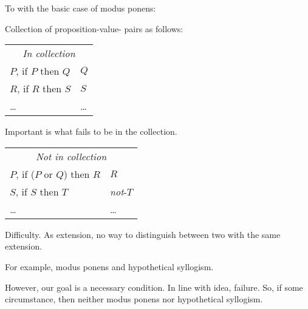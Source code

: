 \begin{note}
  To  with the basic case of modus ponens:

  \begin{illustration}
    Collection of proposition-value-\pool{} pairs as follows:

    \begin{center}
      \begin{tabular}[h]{p{.55\linewidth}|p{.4\linewidth}}
        \multicolumn{2}{c}{\emph{In collection}} \\
        \(P\), if \(P\) then \(Q\) & \(Q\) \\
        \(R\), if \(R\) then \(S\) & \(S\) \\
        \dots & \dots \\
      \end{tabular}
    \end{center}

    Important is what fails to be in the collection.

    \begin{center}
      \begin{tabular}[h]{p{.55\linewidth}|p{.4\linewidth}}
        \multicolumn{2}{c}{\emph{Not in collection}} \\
        \(P\), if (\(P\text{ or }Q\)) then \(R\) & \(R\) \\
        \(S\), if \(S\) then \(T\) & \emph{not}-\(T\) \\
        \dots & \dots \\
      \end{tabular}
    \end{center}
  \end{illustration}
\end{note}

\begin{note}
  Difficulty.
  As extension, no way to distinguish between two  with the same extension.

  For example, modus ponens and hypothetical syllogism.

  However, our goal is a necessary condition.
  In line with idea, failure.
  So, if some circumstance, then neither modus ponens nor hypothetical syllogism.
\end{note}


